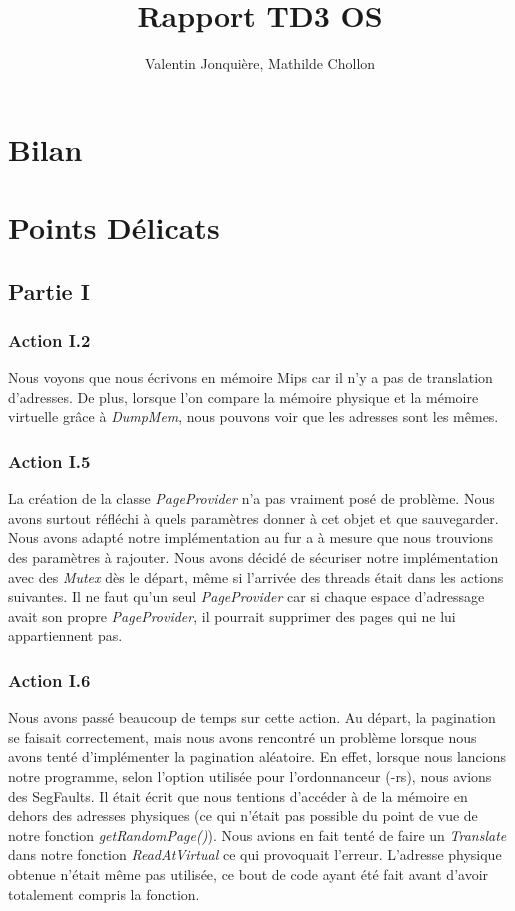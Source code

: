 \documentclass{article}
\author{
    Valentin Jonquière,
    Mathilde Chollon
}
\title{Rapport TD3 OS}
\begin{document}
\maketitle

\pagebreak

\tableofcontents

\pagebreak

\section{Bilan}

\section{Points Délicats}
\subsection{Partie I}
\subsubsection{Action I.2}
Nous voyons que nous écrivons en mémoire Mips car il n'y a pas de translation d'adresses. De plus, lorsque 
l'on compare la mémoire physique et la mémoire virtuelle grâce à \textit{DumpMem}, nous pouvons voir que les adresses sont les mêmes.

\subsubsection{Action I.5}
La création de la classe \textit{PageProvider} n'a pas vraiment posé de problème. Nous avons
surtout réfléchi à quels paramètres donner à cet objet et que sauvegarder. Nous avons 
adapté notre implémentation au fur a à mesure que nous trouvions des paramètres à rajouter.
Nous avons décidé de sécuriser notre implémentation avec des \textit{Mutex} dès le départ,
même si l'arrivée des threads était dans les actions suivantes. Il ne faut qu'un seul \textit{PageProvider}
car si chaque espace d'adressage avait son propre \textit{PageProvider}, il pourrait supprimer des
pages qui ne lui appartiennent pas.

\subsubsection{Action I.6}
Nous avons passé beaucoup de temps sur cette action. Au départ, la pagination se faisait 
correctement, mais nous avons rencontré un problème
 lorsque nous avons tenté d'implémenter la pagination aléatoire. En effet, lorsque nous lancions
 notre programme, selon l'option utilisée pour l'ordonnanceur (-rs), nous avions des SegFaults.
 Il était écrit que nous tentions d'accéder à de la mémoire en dehors des adresses physiques (ce qui
 n'était pas possible du point de vue de notre fonction \textit{getRandomPage()}). Nous avions en fait
 tenté de faire un \textit{Translate} dans notre fonction \textit{ReadAtVirtual} ce qui provoquait
 l'erreur. L'adresse physique obtenue n'était même pas utilisée, ce bout de code ayant
 été fait avant d'avoir totalement compris la fonction.
\end{document}

